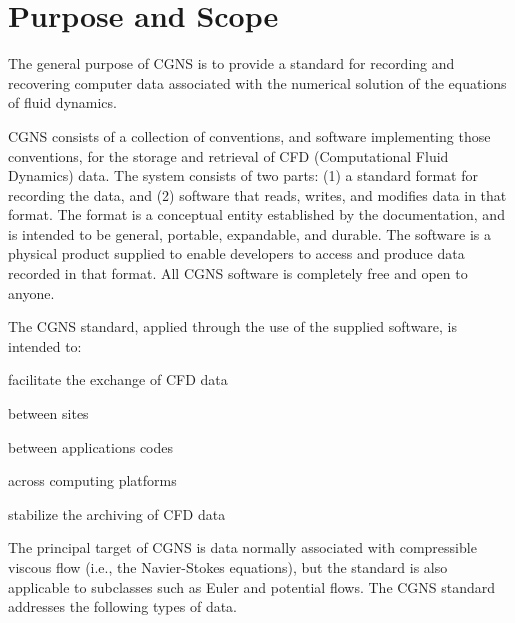 \section{Purpose and Scope}
\label{s:purpose}
\thispagestyle{plain}

The general purpose of CGNS is to provide a standard for recording and
recovering computer data associated with the numerical solution of the
equations of fluid dynamics.

CGNS consists of a collection of conventions, and software implementing
those conventions, for the storage and retrieval of CFD (Computational
Fluid Dynamics) data.
The system consists of two parts: (1) a standard format for recording
the data, and (2) software that reads, writes, and modifies data in that
format.
The format is a conceptual entity established by the documentation, and
is intended to be general, portable, expandable, and durable.
The software is a physical product supplied to enable developers to
access and produce data recorded in that format.
All CGNS software is completely free and open to anyone. 

The CGNS standard, applied through the use of the supplied software, is
intended to:

\begin{itemize*}
   \item facilitate the exchange of CFD data
   \begin{itemize*}
      \item between sites
      \item between applications codes
      \item across computing platforms
   \end{itemize*}
   \item stabilize the archiving of CFD data
\end{itemize*}

The principal target of CGNS is data normally associated with
compressible viscous flow (i.e., the Navier-Stokes equations), but the
standard is also applicable to subclasses such as Euler and potential
flows.
The CGNS standard addresses the following types of data.

